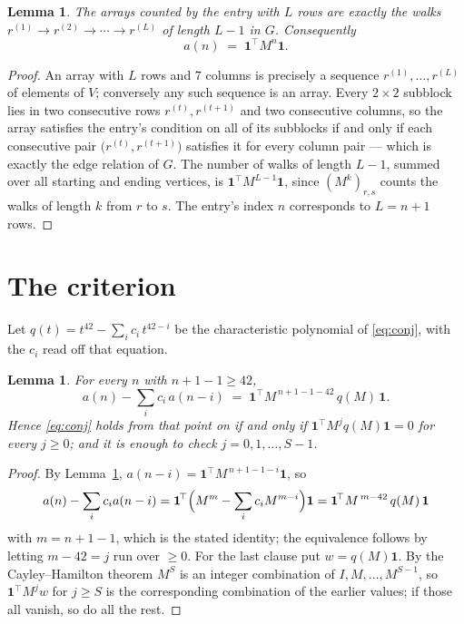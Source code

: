 \documentclass[11pt,a4paper]{article}
\theoremstyle{plain}
\newtheorem{lemma}[theorem]{Lemma}
\theoremstyle{definition}
\begin{document}
\begin{lemma}\label{lem:walk}
The arrays counted by the entry with $L$ rows are exactly the walks
$r^{(1)}\to r^{(2)}\to\cdots\to r^{(L)}$ of length $L-1$ in $G$. Consequently
\[
a(n)\;=\;\mathbf{1}^{\!\top}M^{n}\mathbf{1} .
\]
\end{lemma}

\begin{proof}
An array with $L$ rows and $7$ columns is precisely a sequence
$r^{(1)},\dots,r^{(L)}$ of elements of $V$; conversely any such sequence is an array.
Every $2\times2$ subblock lies in two consecutive rows $r^{(t)},r^{(t+1)}$ and two
consecutive columns, so the array satisfies the entry's condition on all of its subblocks
if and only if each consecutive pair $\bigl(r^{(t)},r^{(t+1)}\bigr)$ satisfies it for
every column pair --- which is exactly the edge relation of $G$. The number of walks of
length $L-1$, summed over all starting and ending vertices, is
$\mathbf{1}^{\!\top}M^{L-1}\mathbf{1}$, since $(M^{k})_{r,s}$ counts the walks of
length $k$ from $r$ to $s$. The entry's index $n$ corresponds to $L=n+1$ rows.
\end{proof}

\section{The criterion}

Let $q(t)=t^{42}-\sum_i c_i\,t^{42-i}$ be the characteristic polynomial of
\eqref{eq:conj}, with the $c_i$ read off that equation.

\begin{lemma}\label{lem:crit}
For every $n$ with $n+1-1\ge42$,
\[
a(n)-\sum_i c_i\,a(n-i)\;=\;\mathbf{1}^{\!\top}M^{\,n+1-1-42}\,q(M)\,\mathbf{1} .
\]
Hence \eqref{eq:conj} holds from that point on if and only if
$\mathbf{1}^{\!\top}M^{j}q(M)\mathbf{1}=0$ for every $j\ge0$; and it is enough to check
$j=0,1,\dots,S-1$.
\end{lemma}

\begin{proof}
By Lemma~\ref{lem:walk}, $a(n-i)=\mathbf{1}^{\!\top}M^{\,n+1-1-i}\mathbf{1}$, so
\[
a(n)-\sum_i c_i a(n-i)
=\mathbf{1}^{\!\top}\Bigl(M^{m}-\sum_i c_i M^{m-i}\Bigr)\mathbf{1}
=\mathbf{1}^{\!\top}M^{\,m-42}\,q(M)\,\mathbf{1}
\]
with $m=n+1-1$, which is the stated identity; the equivalence follows by letting
$m-42=j$ run over $\ge0$. For the last clause put $w=q(M)\mathbf{1}$. By the
Cayley--Hamilton theorem $M^{S}$ is an integer combination of $I,M,\dots,M^{S-1}$, so
$\mathbf{1}^{\!\top}M^{j}w$ for $j\ge S$ is the corresponding combination of the earlier
values; if those all vanish, so do all the rest.
\end{proof}
\end{document}
